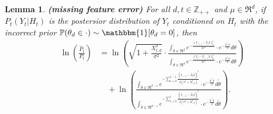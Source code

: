 \documentclass[twoside,11pt]{article}
\newtheorem{lemma}[theorem]{Lemma}
\def\proxytheta{\tilde{\theta}}
\def\Pr{\mathbb{P}}
\begin{document}
\begin{lemma}
    \label{le:missing_feature_pdf}{\bf (missing feature error)}
     For all $d, t \in \mathbb{Z}_{++}$ and $\mu \in \Re^d$, if $P_t(Y_t|H_t)$ is the postersior distribution of $Y_t$ conditioned on $H_t$ with the incorrect prior $\Pr(\theta_d\in\cdot)\sim \mathbbm{1}[\theta_d = 0]$, then
     \begin{align*}
        \ln\left(\frac{\hat{P}_t}{P_t}\right)
         & = \ln\left(\sqrt{1 + \frac{X_{t, d}^2}{\sigma^2}}\cdot\frac{\int_{\theta\in\Re^d}e^{-\frac{\|\mathbb{Y}_{t+1} - \tilde{\mathbb{X}}_{t}\theta\|^2_2}{2\sigma^2}}\cdot e^{-\frac{\theta^\top\theta}{2}}d\theta}{ \int_{\theta\in\Re^d}e^{-\frac{\|\mathbb{Y}_{t} - \tilde{\mathbb{X}}_{t-1}\theta\|^2_2}{2\sigma^2}}\cdot e^{-\frac{\theta^\top\theta}{2}}d\theta }\right)\\
        &\quad + \ln\left(
        \frac{\int_{\proxytheta\in\Re^{d-1}}e^{-\sum_{i=0}^{t-1}\frac{(\mathbb{Y}_{i+1} - \tilde{X}_{i}\proxytheta)^2}{2(\sigma^2 + X_{i,d}^2)}}\cdot e^{-\frac{\proxytheta^\top\proxytheta}{2}}d\proxytheta}{\int_{\proxytheta\in\Re^{d-1}}e^{-\sum_{i=0}^{t}\frac{(\mathbb{Y}_{i+1} - \tilde{X}_{i}\proxytheta)^2}{2(\sigma^2 + X_{i,d}^2)}}\cdot e^{-\frac{\proxytheta^\top\proxytheta}{2}}d\proxytheta}\right).\\
     \end{align*}
\end{lemma}
\end{document}
